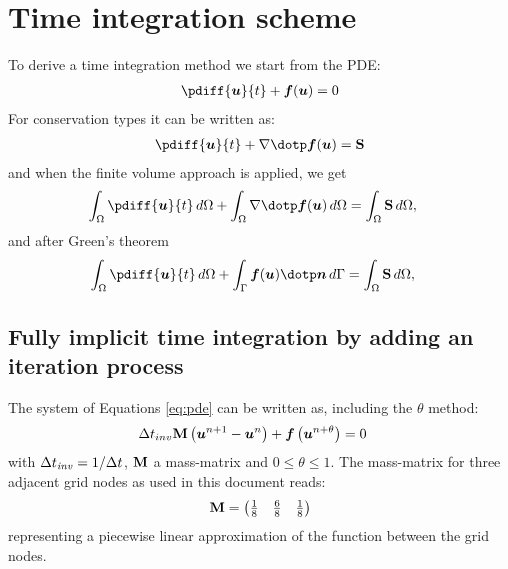 \chapter{Time integration scheme}\label{sec:time_integration}
To derive a time integration method we start from the PDE:
\begin{align}
    \pdiff{\vec{u}}{t} + \vec{f}(\vec{u}) = 0\label{eq:pde}
\end{align}
For conservation types it can be written as:
\begin{align}
    \pdiff{\vec{u}}{t} + \nabla \dotp \vec{f}(\vec{u}) = \mat{S}
\end{align}
and when the finite volume approach is applied, we get
\begin{align}
    \int_\Omega \pdiff{\vec{u}}{t}\, d\Omega + \int_\Omega \nabla \dotp \vec{f}(\vec{u})\, d\Omega&= \int_\Omega \mat{S}\, d\Omega,
\end{align}
and after Green's theorem
\begin{align}
    \int_\Omega \pdiff{\vec{u}}{t}\, d\Omega + \int_\Gamma \vec{f}(\vec{u}) \dotp \vec{n}\, d\Gamma&= \int_\Omega \mat{S}\, d\Omega,
\end{align}
\section{Fully implicit time integration by adding an iteration process}\label{sec:fully_implicit}
The system of Equations \eqref{eq:pde} can be written as, including the $\theta$ method:
\begin{align}
    &\Delta t_{inv} \mbox{\boldmath ${\rm M}$} \left( \mbox{\boldmath ${u}$}^{n+1} - \mbox{\boldmath ${u}$}^{n} \right)  +
    \mbox{\boldmath ${f}$} \left( \mbox{\boldmath ${u}$}^{n+\theta} \right) = 0 \label{eq:discretized}
\end{align}
with $\Delta t_{\it inv} = 1/\Delta t$, $\mbox{\boldmath ${\rm M}$}$ a mass-matrix and $0 \leq \theta \leq 1$.
The mass-matrix for three adjacent grid nodes as used in this document reads:
\begin{align}
    \mbox{\boldmath ${\rm M}$} = \begin{pmatrix} \frac{1}{8} \quad \frac{6}{8} \quad \frac{1}{8} \end{pmatrix}
    \label{eq:definition_mass_matrix}
\end{align}
representing a piecewise linear approximation of the function between the grid nodes.

